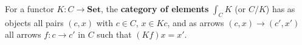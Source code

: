 For a functor $K: C \rightarrow \mathbf{Set}$, the \textbf{category of elements} $\int_C K$ (or $C/K$) has as objects all pairs $(c, x)$ with $c \in C$, $x \in Kc$, and as arrows $(c, x) \rightarrow (c', x')$ all arrows $f: c \rightarrow c'$ in $C$ such that $(Kf)x = x'$.